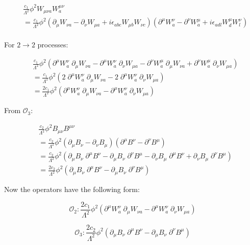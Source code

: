 \documentclass[12pt]{report}
\begin{document}
\begin{align*}
& \frac{c_1}{\Lambda^2} \phi^2 W_{\mu \nu a} W^{\mu \nu}_a \\
&=\frac{c_1}{\Lambda^2} \phi^2(\partial_\mu W_{\nu a} - \partial_\nu W_{\mu a} + i \epsilon_{abc} W_{\mu b} W_{\nu c}) (\partial^\mu W^\nu_a- \partial^\nu W^\mu_a+ i \epsilon_{adl} W^\mu_d W^\nu_l)\\
\end{align*}



For $2 \longrightarrow 2$ processes:



\begin{align*}
&\frac{c_1}{\Lambda^2} \phi^2 (\partial^\mu W^\nu_a\; \partial_\mu W_{\nu a} -\partial^\mu W^\nu_a\; \partial_\nu W_{\mu a}- \partial^\nu W^\mu_a\; \partial_\mu W_{\nu a} + \partial^\nu W^\mu_a\; \partial_\nu W_{\mu a})\\
&=\frac{c_1}{\Lambda^2} \phi^2 (2\; \partial^\mu W^\nu_a\; \partial_\mu W_{\nu a}-2\; \partial^\mu W^\nu_a\; \partial_\nu W_{\mu a})\\
&=\frac{2c_1}{\Lambda^2} \phi^2 (\partial^\mu W^\nu_a\; \partial_\mu W_{\nu a}- \partial^\mu W^\nu_a\; \partial_\nu W_{\mu a})
\end{align*}

From $\mathcal{O}_3 $:

\begin{align*}
&\frac{c_2}{\Lambda^2} \phi^2 B_{\mu \nu} B^{\mu \nu}\\
&=\frac{c_2}{\Lambda^2} \phi^2 (\partial_\mu B_\nu - \partial_\nu B_\mu) (\partial^\mu B^\nu - \partial^\nu B^\mu)\\
& =\frac{c_2}{\Lambda^2} \phi^2 (\partial_\mu B_\nu\; \partial^\mu B^\nu - \partial_\mu B_\nu\; \partial^\nu B^\mu - \partial_\nu B_\mu\; \partial^\mu B^\nu +\partial_\nu B_\mu\; \partial^\nu B^\mu)\\
& =\frac{2c_2}{\Lambda^2} \phi^2 (\partial_\mu B_\nu\; \partial^\mu B^\nu-\partial_\mu B_\nu\; \partial^\nu B^\mu)
\end{align*}

Now the operators have the following form:

\begin{equation}
\mathcal{O}_2 : \frac{2c_1}{\Lambda^2} \phi^2 (\partial^\mu W^\nu_a\; \partial_\mu W_{\nu a}- \partial^\mu W^\nu_a\; \partial_\nu W_{\mu a}) \label{wwop}
\end{equation}

\begin{equation}
\mathcal{O}_3 :\frac{2c_2}{\Lambda^2} \phi^2 (\partial_\mu B_\nu\; \partial^\mu B^\nu-\partial_\mu B_\nu\; \partial^\nu B^\mu) \label{zzop}
\end{equation}
\end{document}
